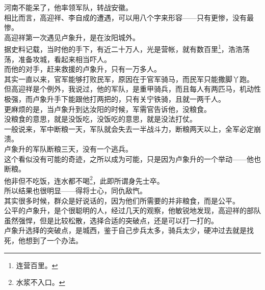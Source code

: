 \begin{multicols}{\theparacolNo}
河南不能呆了，他率领军队，转战安徽。\\

相比而言，高迎祥、李自成的遭遇，可以用八个字来形容——只有更惨，没有最惨。\\

高迎祥第一次遇见卢象升，是在汝阳城外。\\

据史料记载，当时他的手下，有近二十万人，光是营帐，就有数百里\footnote{连营百里。}，浩浩荡荡，准备攻城，看起来相当吓人。\\

而他的对手，赶来救援的卢象升，只有一万多人。\\

其实一直以来，官军能够打败民军，原因在于官军骑马，而民军只能撒脚丫跑。\\

但高迎祥是个例外，我说过，他的军队，是重甲骑兵，而且每人有两匹马，机动性极强，而卢象升手下能跟他打两把的，只有关宁铁骑，且就一两千人。\\

更麻烦的是，当卢象升到达汝阳的时候，军需官告诉他，没粮食。\\

没粮食的意思，就是没饭吃，没饭吃的意思，就是没法打仗。\\

一般说来，军中断粮一天，军队就会失去一半战斗力，断粮两天以上，全军必定崩溃。\\

卢象升的军队断粮三天，没有一个逃兵。\\

这个看似没有可能的奇迹，之所以成为可能，只是因为卢象升的一个举动——他也断粮。\\

他非但不吃饭，连水都不喝\footnote{水浆不入口。}，此即所谓身先士卒。\\

所以结果也很明显——得将士心，同仇敌忾。\\

其实很多时候，群众是好说话的，因为他们所需要的并非粮食，而是公平。\\

公平的卢象升，是个很聪明的人，经过几天的观察，他敏锐地发现，高迎祥的部队虽然强悍，但是比较松散，选择合适的突破点，还是可以打一打的。\\

卢象升选择的突破点，是城西，鉴于自己步兵太多，骑兵太少，硬冲过去就是找死，他想到了一个办法。\\


\end{multicols}
